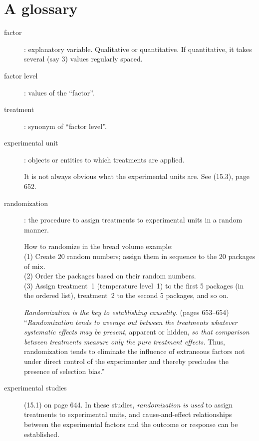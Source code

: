\documentclass[12pt]{article}
\begin{document}
\section*{A glossary}

\begin{description}

\item[factor]: explanatory variable. Qualitative or quantitative.
If quantitative, it takes several (say 3) values regularly spaced.

\item[factor level]: values of the ``factor''.

\item[treatment]: synonym of ``factor level''.

\item[experimental unit]: objects or entities to which treatments are
applied.

It is not always obvious what the experimental units are.
See (15.3), page 652.

\item[randomization]: the procedure to assign treatments to experimental
units in a random manner.

\example%
How to randomize in the bread volume example:\\
(1) Create 20 random numbers; assign them in sequence to the 20 packages
of mix.\\
(2) Order the packages based on their random numbers.\\
(3) Assign treatment~1 (temperature level~1) to the first 5 packages (in
the ordered list), treatment~2 to the second 5 packages, and so on.

\emph{Randomization is the key to establishing causality.} (pages
653--654)
``\emph{Randomization tends to average out between the treatments whatever
systematic effects may be present}, apparent or hidden, \emph{so that
comparison between treatments measure only the pure treatment effects.}
Thus, randomization tends to eliminate the influence of extraneous
factors not under direct control of the experimenter and thereby
precludes the presence of selection bias.''

\item[experimental studies] (15.1) on page 644.
In these studies, \emph{randomization is used} to assign treatments to
experimental units, and cause-and-effect relationships
between the experimental factors and the outcome or response can be
established.


\end{description}
\end{document}
